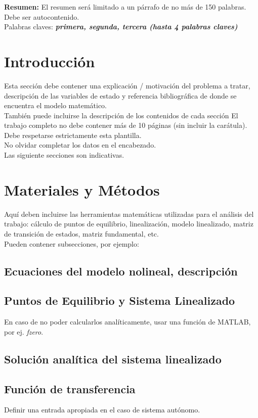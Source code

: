 \documentclass[11pt, a4paper]{article}
\begin{document}
{\fontsize{10}{10} \textbf{Resumen:} El resumen será limitado a un párrafo de no más de 150 palabras. Debe ser autocontenido.\\
Palabras claves: \textit{\textbf{primera, segunda, tercera (hasta 4 palabras claves)}}}

\section{Introducción}
Esta sección debe contener una explicación / motivación del problema a tratar, descripción de las variables de estado y referencia bibliográfica de donde se encuentra el modelo matemático.\\
También puede incluirse la descripción de los contenidos de cada sección
El trabajo completo no debe contener más de 10 páginas (sin incluir la carátula).\\
Debe respetarse estrictamente esta plantilla.\\
No olvidar completar los datos en el encabezado.\\
Las siguiente secciones son indicativas.

\section{Materiales y Métodos}
Aquí deben incluirse las herramientas matemáticas utilizadas para el análisis del trabajo: cálculo de puntos de equilibrio, linealización, modelo linealizado, matriz de transición de estados, matriz fundamental, etc.\\
Pueden contener subsecciones, por ejemplo:
\subsection{Ecuaciones del modelo nolineal, descripción}
\subsection{Puntos de Equilibrio y Sistema Linealizado}
En caso de no poder calcularlos analíticamente, usar una función de MATLAB, por ej. \textit{fzero}.
\subsection{Solución analítica del sistema linealizado}
\subsection[Función de transferencia]{Función de transferencia}
Definir una entrada apropiada en el caso de sistema autónomo.
\end{document}
